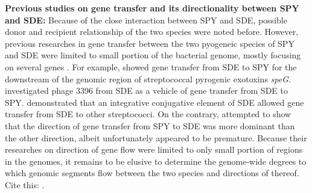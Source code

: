 \documentclass[english]{article}
\begin{document}
\textbf{Previous studies on gene transfer and its directionality between
SPY and SDE:} 
Because of the close interaction between SPY and SDE, 
possible donor and recipient relationship of the two species were noted before.
However, previous researches in gene transfer between
the two pyogeneic species of SPY and SDE were limited to small portion
of the bacterial genome, mostly focusing on several genes 
\citep{Kalia2004,Towers2004,Bessen2005}.
For example, \citet{Sachse2002} showed gene transfer from SDE to
SPY for the downstream of the genomic region of streptococcal pyrogenic
exotoxins \emph{speG}. \citet{Davies2007} investigated phage 3396
from SDE as a vehicle of gene transfer from SDE to SPY. \citet{Davies2009}
demonstrated that an integrative conjugative element of SDE allowed
gene transfer from SDE to other streptococci. On the contrary, \citet{Kalia2001}
attempted to show that the direction of gene transfer from SPY to
SDE was more dominant than the other direction, albeit unfortunately
appeared to be premature. Because their researches on direction of
gene flow were limited to only small portion of regions in the genomes,
it remains to be elusive to determine the genome-wide degrees to which
genomic segments flow between the two species and directions of thereof.
Cite this: \citep{Ahmad2009}.
\end{document}
